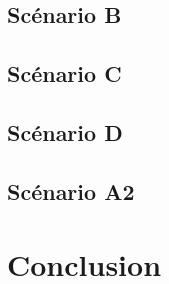 \documentclass[a4paper, 11pt, french]{report}
\begin{document}
\subsection{Scénario B}


\subsection{Scénario C}


\subsection{Scénario D}


\subsection{Scénario A2}


\section{Conclusion}

\end{document}
